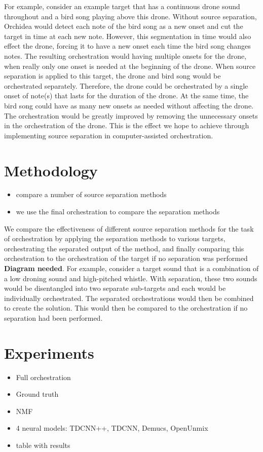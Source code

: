 \documentclass{article}
\begin{document}
		For example, consider an example target that has a continuous drone sound throughout and a bird song playing above this drone. Without source separation, Orchidea would detect each note of the bird song as a new onset and cut the target in time at each new note. However, this segmentation in time would also effect the drone, forcing it to have a new onset each time the bird song changes notes. The resulting orchestration would having multiple onsets for the drone, when really only one onset is needed at the beginning of the drone. When source separation is applied to this target, the drone and bird song would be orchestrated separately. Therefore, the drone could be orchestrated by a single onset of note(s) that lasts for the duration of the drone. At the same time, the bird song could have as many new onsets as needed without affecting the drone. The orchestration would be greatly improved by removing the unnecessary onsets in the orchestration of the drone. This is the effect we hope to achieve through implementing source separation in computer-assisted orchestration.
		
	
	\section{Methodology}\label{sec:methodology}
	\begin{itemize}
		\item compare a number of source separation methods
		\item we use the final orchestration to compare the separation methods
	\end{itemize}
	
	We compare the effectiveness of different source separation methods for the task of orchestration by applying the separation methods to various targets, orchestrating the separated output of the method, and finally comparing this orchestration to the orchestration of the target if no separation was performed \textbf{Diagram needed}. For example, consider a target sound that is a combination of a low droning sound and high-pitched whistle. With separation, these two sounds would be disentangled into two separate sub-targets and each would be individually orchestrated. The separated orchestrations would then be combined to create the solution. This would then be compared to the orchestration if no separation had been performed.
	
	
	\section{Experiments}\label{sec:experiments}
	\begin{itemize}
		\item Full orchestration
		\item Ground truth
		\item NMF
		\item 4 neural models: TDCNN++, TDCNN, Demucs, OpenUnmix
		\item table with results
	\end{itemize}
	
\end{document}
